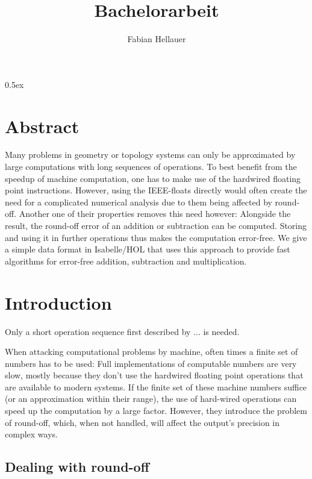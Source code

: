 \documentclass[11pt,a4paper]{article}
\begin{document}
\title{Bachelorarbeit}
\author{Fabian Hellauer}
\maketitle

\tableofcontents

\parindent 0pt\parskip 0.5ex

\section{Abstract}

Many problems in geometry or topology systems can only be approximated by large computations with long sequences of operations. To best benefit from the speedup of machine computation, one has to make use of the hardwired floating point instructions. However, using the IEEE-floats directly would often create the need for a complicated numerical analysis due to them being affected by round-off.
Another one of their properties removes this need however: Alongside the result, the round-off error of an addition or subtraction can be computed. Storing and using it in further operations thus makes the computation error-free.
We give a simple data format in Isabelle/HOL that uses this approach to provide fast algorithms for error-free addition, subtraction and multiplication.

\section{Introduction}

Only a short operation sequence first described by ... is needed.

When attacking computational problems by machine, often times a finite set of numbers has to be used: Full implementations of computable numbers are very slow, mostly because they don't use the hardwired floating point operations that are available to modern systems. If the finite set of these machine numbers suffice (or an approximation within their range), the use of hard-wired operations can speed up the computation by a large factor. However, they introduce the problem of round-off, which, when not handled, will affect the output's precision in complex ways.

\subsection{Dealing with round-off}
\end{document}
